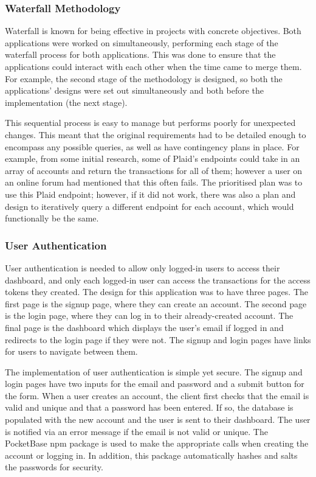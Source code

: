 \subsubsection{Waterfall Methodology}
Waterfall is known for being effective in projects with concrete objectives. Both applications were worked on simultaneously, performing each stage of the waterfall process for both applications. This was done to ensure that the applications could interact with each other when the time came to merge them. For example, the second stage of the methodology is designed, so both the applications' designs were set out simultaneously and both before the implementation (the next stage).

This sequential process is easy to manage but performs poorly for unexpected changes. This meant that the original requirements had to be detailed enough to encompass any possible queries, as well as have contingency plans in place. For example, from some initial research, some of Plaid's endpoints could take in an array of accounts and return the transactions for all of them; however a user on an online forum had mentioned that this often fails. The prioritised plan was to use this Plaid endpoint; however, if it did not work, there was also a plan and design to iteratively query a different endpoint for each account, which would functionally be the same.

\subsubsection{User Authentication}
User authentication is needed to allow only logged-in users to access their dashboard, and only each logged-in user can access the transactions for the access tokens they created. The design for this application was to have three pages. The first page is the signup page, where they can create an account. The second page is the login page, where they can log in to their already-created account. The final page is the dashboard which displays the user's email if logged in and redirects to the login page if they were not. The signup and login pages have links for users to navigate between them.

The implementation of user authentication is simple yet secure. The signup and login pages have two inputs for the email and password and a submit button for the form. When a user creates an account, the client first checks that the email is valid and unique and that a password has been entered. If so, the database is populated with the new account and the user is sent to their dashboard. The user is notified via an error message if the email is not valid or unique. The PocketBase npm package is used to make the appropriate calls when creating the account or logging in. In addition, this package automatically hashes and salts the passwords for security.

